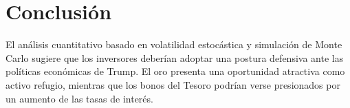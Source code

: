 \documentclass{article}
\begin{document}
\section{Conclusión}
El análisis cuantitativo basado en volatilidad estocástica y simulación de Monte Carlo sugiere que los inversores deberían adoptar una postura defensiva ante las políticas económicas de Trump. El oro presenta una oportunidad atractiva como activo refugio, mientras que los bonos del Tesoro podrían verse presionados por un aumento de las tasas de interés.
\end{document}
